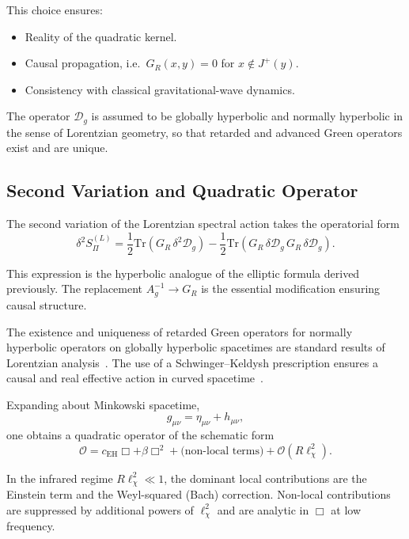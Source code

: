     This choice ensures:

    \begin{itemize}
      \item Reality of the quadratic kernel.
      \item Causal propagation, i.e.\ $G_R(x,y)=0$ for $x \notin J^+(y)$.
      \item Consistency with classical gravitational-wave dynamics.
    \end{itemize}

    The operator $\mathcal{D}_g$ is assumed to be globally hyperbolic and
    normally hyperbolic in the sense of Lorentzian geometry, so that
    retarded and advanced Green operators exist and are unique.

  \subsection{Second Variation and Quadratic Operator}
    \label{subsec:second-variation-and-quadratic-operator}

    The second variation of the Lorentzian spectral action takes the operatorial form
    \[
      \delta^2 S_\Pi^{(L)} = \frac12 \mathrm{Tr} \left( G_R \,\delta^2 \mathcal{D}_g \right)
      -
      \frac12 \mathrm{Tr} \left(
        G_R \,\delta \mathcal{D}_g\,
        G_R \,\delta \mathcal{D}_g
      \right).
    \]

    This expression is the hyperbolic analogue of the elliptic formula derived previously.
    The replacement $A_g^{-1} \to G_R$ is the essential modification ensuring causal structure.

    The existence and uniqueness of retarded Green operators for normally
    hyperbolic operators on globally hyperbolic spacetimes are standard
    results of Lorentzian analysis~\cite{Baer2015}.
    The use of a Schwinger--Keldysh prescription ensures a causal and
    real effective action in curved spacetime~\cite{Jordan1986,Calzetta2008}.

    Expanding about Minkowski spacetime,
    \[
      g_{\mu\nu} = \eta_{\mu\nu} + h_{\mu\nu},
    \]
    one obtains a quadratic operator of the schematic form
    \[
      \mathcal{O} = c_{\mathrm{EH}} \Box + \beta \Box^2 + \text{(non-local terms)} + \mathcal{O}(R\ell_\chi^2).
    \]

    In the infrared regime $R\ell_\chi^2 \ll 1$, the dominant local contributions are the Einstein term and the
    Weyl-squared (Bach) correction.
    Non-local contributions are suppressed by additional powers of
    $\ell_\chi^2$ and are analytic in $\Box$ at low frequency.

